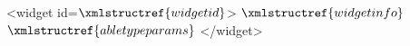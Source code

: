 <widget id=$\xmlstructref{widgetid}$>
  $\xmlstructref{widgetinfo}$
  $\xmlstructref{abletypeparams}$
</widget>
